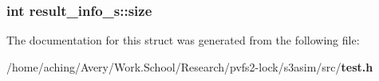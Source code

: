 \subsubsection{\setlength{\rightskip}{0pt plus 5cm}int \bf{result\_\-info\_\-s::size}}\label{structresult__info__s_0ac20605680c6afb580743b9d0a3c3d5}




The documentation for this struct was generated from the following file:\begin{CompactItemize}
\item 
/home/aching/Avery/Work.School/Research/pvfs2-lock/s3asim/src/\bf{test.h}\end{CompactItemize}
